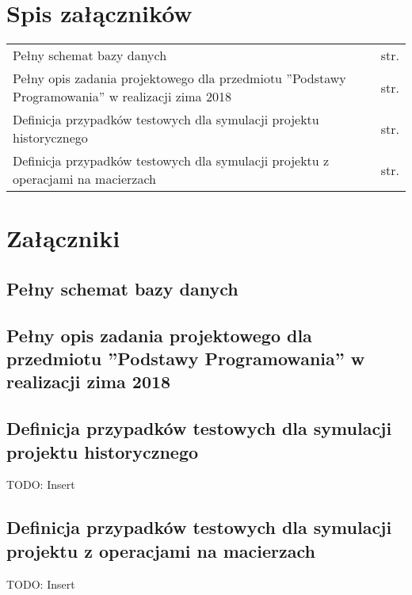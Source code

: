 \chapter*{Spis załączników}
\noindent

\begin{tabularx}{\textwidth}{Xl}

    Pełny schemat bazy danych & str. \pageref{file:database-schema} \\

    Pełny opis zadania projektowego dla przedmiotu ”Podstawy Programowania” w realizacji zima 2018 & str. \pageref{file:penguins_description} \\

    Definicja przypadków testowych dla symulacji projektu historycznego & str. \pageref{file:test_cases_penguins} \\

    Definicja przypadków testowych dla symulacji projektu z operacjami na macierzach & str. \pageref{file:test_cases_matrix} \\

\end{tabularx}

\chapter*{Załączniki}

\section*{Pełny schemat bazy danych}
\label{file:database-schema}
{
\tiny

}

\section*{Pełny opis zadania projektowego dla przedmiotu ”Podstawy Programowania” w realizacji zima 2018}
\label{file:penguins_description}
{

}


\section*{Definicja przypadków testowych dla symulacji projektu historycznego}
\label{file:test_cases_penguins}

{
TODO: Insert
}

\section*{Definicja przypadków testowych dla symulacji projektu z operacjami na macierzach}
\label{file:test_cases_matrix}

{
TODO: Insert
}


\clearpage
